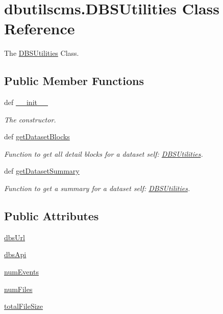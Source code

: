 \section{dbutilscms.\-D\-B\-S\-Utilities Class Reference}
\label{classdbutilscms_1_1DBSUtilities}


The \hyperlink{classdbutilscms_1_1DBSUtilities}{D\-B\-S\-Utilities} Class.  


\subsection*{Public Member Functions}
\begin{DoxyCompactItemize}
\item 
def \hyperlink{classdbutilscms_1_1DBSUtilities_a370df2d0f173d50c61f8401f9723d789}{\-\_\-\-\_\-init\-\_\-\-\_\-}
\begin{DoxyCompactList}\small\item\em The constructor. \end{DoxyCompactList}\item 
def \hyperlink{classdbutilscms_1_1DBSUtilities_a0fbdb3a522d1dff32847f0e84b107097}{get\-Dataset\-Blocks}
\begin{DoxyCompactList}\small\item\em Function to get all detail blocks for a dataset  self\-: \hyperlink{classdbutilscms_1_1DBSUtilities}{D\-B\-S\-Utilities}. \end{DoxyCompactList}\item 
def \hyperlink{classdbutilscms_1_1DBSUtilities_af89c0b26e1f1da199e7f95c0c2135f4c}{get\-Dataset\-Summary}
\begin{DoxyCompactList}\small\item\em Function to get a summary for a dataset  self\-: \hyperlink{classdbutilscms_1_1DBSUtilities}{D\-B\-S\-Utilities}. \end{DoxyCompactList}\end{DoxyCompactItemize}
\subsection*{Public Attributes}
\begin{DoxyCompactItemize}
\item 
\hyperlink{classdbutilscms_1_1DBSUtilities_a59b0f48798e9dc3ef227ca56f37d0745}{dbs\-Url}
\item 
\hyperlink{classdbutilscms_1_1DBSUtilities_a42d52841e58935a7cde5cb8bba1de3fb}{dbs\-Api}
\item 
\hyperlink{classdbutilscms_1_1DBSUtilities_aad50ec4240e6e58b5f37520ec1678c23}{num\-Events}
\item 
\hyperlink{classdbutilscms_1_1DBSUtilities_a582a7766536cdf50ef736f5ca6138209}{num\-Files}
\item 
\hyperlink{classdbutilscms_1_1DBSUtilities_a14665ed3caa9f768da3e01791dbf5a05}{total\-File\-Size}
\end{DoxyCompactItemize}


